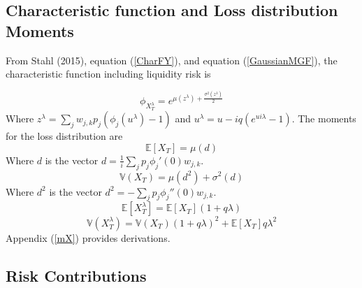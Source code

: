 \documentclass[12pt]{article}
\theoremstyle{definition}
\begin{document}
\subsection{Characteristic function and Loss distribution Moments}
From Stahl (2015), equation (\ref{CharFY}), and equation (\ref{GaussianMGF}), the characteristic function including liquidity risk is

\begin{equation} \label{finalCH}
\phi_{X_T ^ \lambda}=e^{\mu(z^\lambda)+\frac{\sigma^2(z^\lambda)}{2} }
\end{equation}
Where \(z^\lambda=\sum_j w_{j, k}  p_j (\phi_j(u^\lambda )-1)\) and \(u^\lambda=u-iq\left(e^{ui\lambda}-1\right)\).  The moments for the loss distribution are
\begin{equation}\label{meX} \mathbb{E}[X_T]=\mu(d) \end{equation} 
Where \(d\) is the vector  \(d=\frac{1}{i}\sum_j p_j \phi_j'(0) w_{j, k}\).
\begin{equation} \label{mvX} \mathbb{V}(X_T)=\mu(d ^2)+\sigma^2(d) \end{equation}
Where \(d ^2\) is the vector \(d^2=-\sum_j p_j\phi_j''(0) w_{j, k}\).
\begin{equation} \label{meXL} \mathbb{E}[X_T ^ \lambda]=\mathbb{E}[X_T](1+q\lambda) \end{equation}
\begin{equation}\label{mvXL} \mathbb{V}(X_T ^ \lambda)=\mathbb{V}(X_T)(1+q\lambda)^2+\mathbb{E}[X_T]q\lambda^2\end{equation}
Appendix (\ref{mX}) provides derivations.
\subsection{Risk Contributions}
\end{document}
